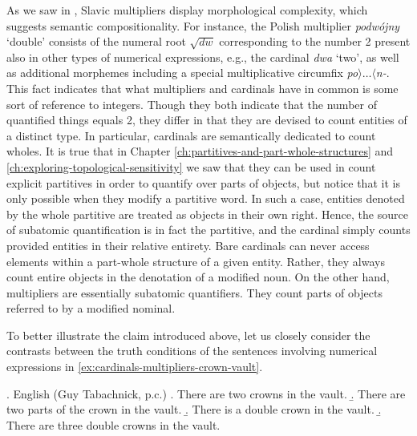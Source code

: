 As we saw in , Slavic multipliers display morphological complexity, which suggests semantic compositionality. For instance, the Polish multiplier \textit{podwójny} `double' consists of the numeral root $\sqrt{\textit{dw}}$ corresponding to the number 2 present also in other types of numerical expressions, e.g., the cardinal \textit{dwa} `two', as well as additional morphemes including a special multiplicative circumfix \textit{po}$\rangle\dots\langle$\textit{n-}. This fact indicates that what multipliers and cardinals have in common is some sort of reference to integers. Though they both indicate that the number of quantified things equals 2, they differ in that they are devised to count entities of a distinct type. In particular, cardinals are semantically dedicated to count wholes. It is true that in Chapter \ref{ch:partitives-and-part-whole-structures} and \ref{ch:exploring-topological-sensitivity} we saw that they can be used in count explicit partitives in order to quantify over parts of objects, but notice that it is only possible when they modify a partitive word. In such a case, entities denoted by the whole partitive are treated as objects in their own right. Hence, the source of subatomic quantification is in fact the partitive, and the cardinal simply counts provided entities in their relative entirety. Bare cardinals can never access elements within a part-whole structure of a given entity. Rather, they always count entire objects in the denotation of a modified noun. On the other hand, multipliers are essentially subatomic quantifiers. They count parts of objects referred to by a modified nominal.

To better illustrate the claim introduced above, let us closely consider the contrasts between the truth conditions of the sentences involving numerical expressions in \ref{ex:cardinals-multipliers-crown-vault}. 

\ex. English (Guy Tabachnick, p.c.)\label{ex:cardinals-multipliers-crown-vault}
\a. There are two crowns in the vault.\label{ex:two-crown-vault}
\b. There are two parts of the crown in the vault.\label{ex:two-parts-crown-vault}
\b. There is a double crown in the vault.\label{ex:double-crown-vault}
\b. There are three double crowns in the vault.\label{two-double-crowns-crown-vault}

